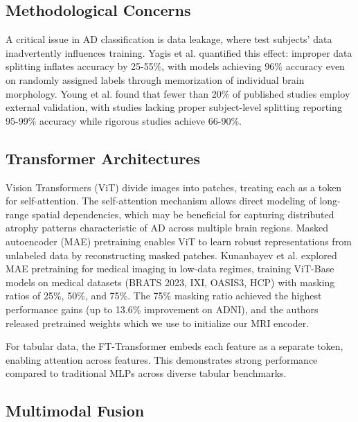\documentclass[conference]{IEEEtran}
\begin{document}
\subsection{Methodological Concerns}
\label{sec:methodological}

A critical issue in AD classification is data leakage, where test subjects' data inadvertently influences training. Yagis et al. \cite{yagis2021} quantified this effect: improper data splitting inflates accuracy by 25-55\%, with models achieving 96\% accuracy even on randomly assigned labels through memorization of individual brain morphology. Young et al. \cite{young2025} found that fewer than 20\% of published studies employ external validation, with studies lacking proper subject-level splitting reporting 95-99\% accuracy while rigorous studies achieve 66-90\%.

\subsection{Transformer Architectures}

Vision Transformers (ViT) \cite{dosovitskiy2021} divide images into patches, treating each as a token for self-attention. The self-attention mechanism allows direct modeling of long-range spatial dependencies, which may be beneficial for capturing distributed atrophy patterns characteristic of AD across multiple brain regions. Masked autoencoder (MAE) pretraining \cite{he2022} enables ViT to learn robust representations from unlabeled data by reconstructing masked patches. Kunanbayev et al. \cite{kunanbayev2024} explored MAE pretraining for medical imaging in low-data regimes, training ViT-Base models on medical datasets (BRATS 2023, IXI, OASIS3, HCP) with masking ratios of 25\%, 50\%, and 75\%. The 75\% masking ratio achieved the highest performance gains (up to 13.6\% improvement on ADNI), and the authors released pretrained weights which we use to initialize our MRI encoder.

For tabular data, the FT-Transformer \cite{gorishniy2021} embeds each feature as a separate token, enabling attention across features. This demonstrates strong performance compared to traditional MLPs across diverse tabular benchmarks.

\subsection{Multimodal Fusion}
\end{document}
